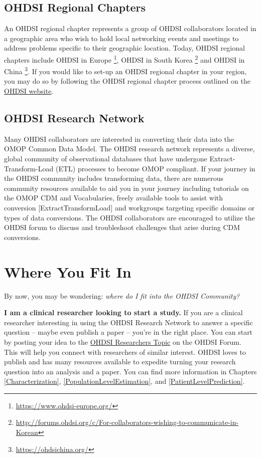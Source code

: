 \documentclass[11pt]{book}
\let\rmarkdownfootnote\footnote%
\def\footnote{\protect\rmarkdownfootnote}
\theoremstyle{definition}
\theoremstyle{definition}
\theoremstyle{definition}
\theoremstyle{remark}
\begin{document}
\hypertarget{ohdsi-regional-chapters}{%
\subsection{OHDSI Regional Chapters}\label{ohdsi-regional-chapters}}

An OHDSI regional chapter represents a group of OHDSI collaborators located in a geographic area who wish to hold local networking events and meetings to address problems specific to their geographic location. Today, OHDSI regional chapters include OHDSI in Europe \footnote{\url{https://www.ohdsi-europe.org/}}, OHDSI in South Korea \footnote{\url{http://forums.ohdsi.org/c/For-collaborators-wishing-to-communicate-in-Korean}} and OHDSI in China \footnote{\url{https://ohdsichina.org/}}. If you would like to set-up an OHDSI regional chapter in your region, you may do so by following the OHDSI regional chapter process outlined on the \href{https://www.ohdsi.org/who-we-are/regional-chapters}{OHDSI website}. 

\hypertarget{ohdsi-research-network}{%
\subsection{OHDSI Research Network}\label{ohdsi-research-network}}

Many OHDSI collaborators are interested in converting their data into the OMOP Common Data Model. The OHDSI research network represents a diverse, global community of observational databases that have undergone Extract-Transform-Load (ETL) processes to become OMOP compliant. If your journey in the OHDSI community includes transforming data, there are numerous community resources available to aid you in your journey including tutorials on the OMOP CDM and Vocabularies, freely available tools to assist with conversion {[}ExtractTransformLoad{]} and workgroups targeting specific domains or types of data conversions. The OHDSI collaborators are encouraged to utilize the OHDSI forum to discuss and troubleshoot challenges that arise during CDM conversions.

\hypertarget{where-you-fit-in}{%
\section{Where You Fit In}\label{where-you-fit-in}}

By now, you may be wondering: \emph{where do I fit into the OHDSI Community?}

\textbf{I am a clinical researcher looking to start a study.} If you are a clinical researcher interesting in using the OHDSI Research Network to answer a specific question -- maybe even publish a paper -- you're in the right place. You can start by posting your idea to the \href{https://forums.ohdsi.org/c/researchers}{OHDSI Researchers Topic} on the OHDSI Forum. This will help you connect with researchers of similar interest. OHDSI loves to publish and has many resources available to expedite turning your research question into an analysis and a paper. You can find more information in Chapters \ref{Characterization}, \ref{PopulationLevelEstimation}, and \ref{PatientLevelPrediction}.
\end{document}
